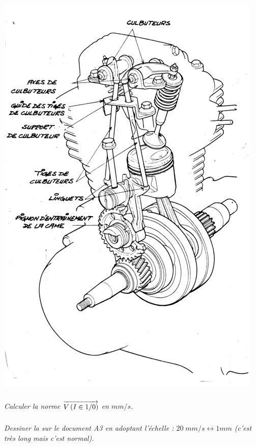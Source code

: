 \documentclass[10pt,fleqn]{article} %
\begin{document}
\begin{minipage}[c]{.48\linewidth}
\begin{center}
\includegraphics[width=.95\textwidth]{images/soupape_1}
\end{center}
\end{minipage}

\subparagraph{}
\textit{Calculer la norme $\overrightarrow{V\left( {I} \in {1}/{0}\right)}$ en $mm/s$.}

\subparagraph{}
\textit{Dessiner la sur le document A3 en adoptant l'échelle : $20\; mm/s \leftrightarrow 1 mm$ (c'est très long mais c'est normal).}
\end{document}
